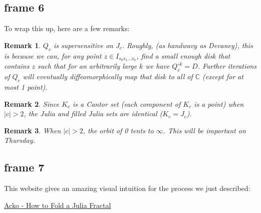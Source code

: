 \documentclass[xcolor=x11names,compress]{beamer}
\renewcommand{\(}{\begin{columns}}
\renewcommand{\)}{\end{columns}}
\newcommand{\<}[1]{\begin{column}{#1}}
\renewcommand{\>}{\end{column}}
\newtheorem{rmk}{Remark}
\begin{document}
\subsection{frame 6}
\begin{frame}

To wrap this up, here are a few remarks:

\vspace{.1cm}
\pause

\begin{rmk}
$Q_c$ is supersensitive on $J_c$. Roughly, (as handwavy as Devaney), this is because we can, for any point $z \in I_{s_0s_1\ldots s_k}$, find a small enough disk that contains $z$ such that for an arbitrarily large $k$ we have $Q_c^{\circ k} = D$. Further iterations of $Q_c$ will eventually diffeomorphically map that disk to 
all of $\mathbb{C}$ (except for at most 1 point).
\end{rmk}

\pause

\begin{rmk}
Since $K_c$ is a Cantor set (each component of $K_c$ is a point) when $|c| > 2$, the Julia and filled Julia sets are identical ($K_c = J_c$).
\end{rmk}

\pause

\begin{rmk}
When $|c| > 2$, the orbit of 0 tents to $\infty$. This will be important on Thursday.
\end{rmk}

\end{frame}





\subsection{frame 7}
\begin{frame}


This website gives an amazing visual intuition for the process we just described:

\vspace{.5cm}



\begin{itemize}
{\color{DeepSkyBlue4}
	\item \href{http://acko.net/blog/how-to-fold-a-julia-fractal/}{Acko - How to Fold a Julia Fractal}
}
\end{itemize}

\end{frame}
\end{document}
